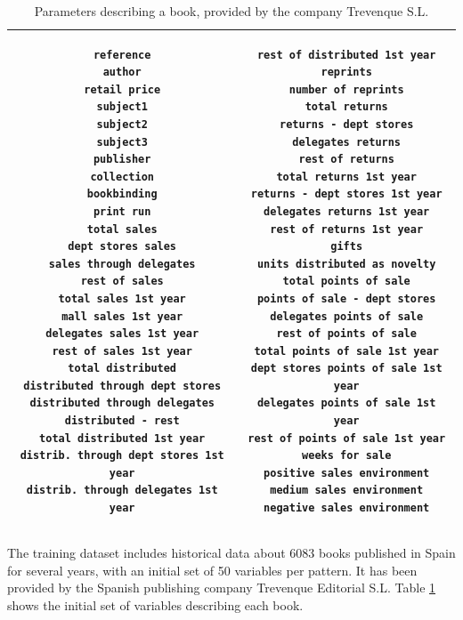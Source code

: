 \documentclass[a4paper,10pt,twocolumn,preprint,3p]{elsarticle}
\begin{document}
\begin{table}[!ht]
\caption{Parameters describing a book, provided by the company Trevenque S.L.}
\label{tabla:paramsOrig50}
\begin{center}
\begin{tabular}{|c|c|}
\hline 

\begin{minipage}{2.45in}\begin{small}
 \begin{verbatim}
reference
author
retail price
subject1
subject2
subject3
publisher
collection
bookbinding
print run
total sales
dept stores sales
sales through delegates
rest of sales
total sales 1st year
mall sales 1st year
delegates sales 1st year
rest of sales 1st year
total distributed
distributed through dept stores
distributed through delegates
distributed - rest
total distributed 1st year
distrib. through dept stores 1st year
distrib. through delegates 1st year
\end{verbatim}
\end{small} \end{minipage}     & 

\begin{minipage}{2.3in} \begin{small}
\begin{verbatim}
rest of distributed 1st year
reprints
number of reprints
total returns
returns - dept stores
delegates returns
rest of returns
total returns 1st year
returns - dept stores 1st year
delegates returns 1st year
rest of returns 1st year
gifts
units distributed as novelty
total points of sale
points of sale - dept stores
delegates points of sale
rest of points of sale
total points of sale 1st year
dept stores points of sale 1st year
delegates points of sale 1st year
rest of points of sale 1st year
weeks for sale
positive sales environment
medium sales environment
negative sales environment
\end{verbatim}
\end{small} \end{minipage}    \\

\hline
\end{tabular}
\end{center}
\end{table}


The training dataset includes historical data about 6083 books
published in Spain for several years, with an initial set of 50
variables per pattern. It has been provided by the Spanish publishing
company Trevenque Editorial S.L. Table \ref{tabla:paramsOrig50} shows the initial set of variables describing each book. 
\end{document}

